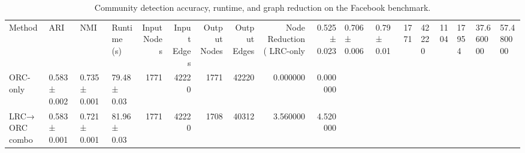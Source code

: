 \begin{table}
\caption{Community detection accuracy, runtime, and graph reduction on the Facebook benchmark.}
\label{tab:facebook_empirical_complexity}
\begin{tabular}{llllrrrrrr}
\toprule
Method & ARI & NMI & Runtime (s) & Input Nodes & Input Edges & Output Nodes & Output Edges & Node Reduction (%
\midrule
LRC-only & 0.525 ± 0.023 & 0.706 ± 0.006 & 0.79 ± 0.01 & 1771 & 42220 & 1104 & 17954 & 37.660000 & 57.480000 \\
ORC-only & 0.583 ± 0.002 & 0.735 ± 0.001 & 79.48 ± 0.03 & 1771 & 42220 & 1771 & 42220 & 0.000000 & 0.000000 \\
LRC→ORC combo & 0.583 ± 0.001 & 0.721 ± 0.001 & 81.96 ± 0.03 & 1771 & 42220 & 1708 & 40312 & 3.560000 & 4.520000 \\
\bottomrule
\end{tabular}
\end{table}
